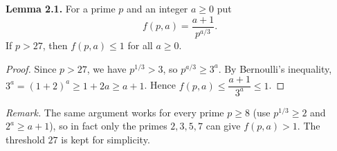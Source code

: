 \begin{thmbox}
\textbf{Lemma 2.1.} For a prime $p$ and an integer $a\ge 0$ put
\[
f(p,a)=\frac{a+1}{p^{a/3}}.
\]
If $p>27$, then $f(p,a)\le 1$ for all $a\ge 0$.
\end{thmbox}

\begin{proof}
Since $p>27$, we have $p^{1/3}>3$, so $p^{a/3}\ge 3^a$. By Bernoulli's inequality, $3^a=(1+2)^a\ge 1+2a\ge a+1$. Hence $f(p,a)\le \dfrac{a+1}{3^a}\le 1$.
\end{proof}

\noindent\textit{Remark.} The same argument works for every prime $p\ge 8$ (use $p^{1/3}\ge 2$ and $2^a\ge a+1$), so in fact only the primes $2,3,5,7$ can give $f(p,a)>1$. The threshold $27$ is kept for simplicity.
